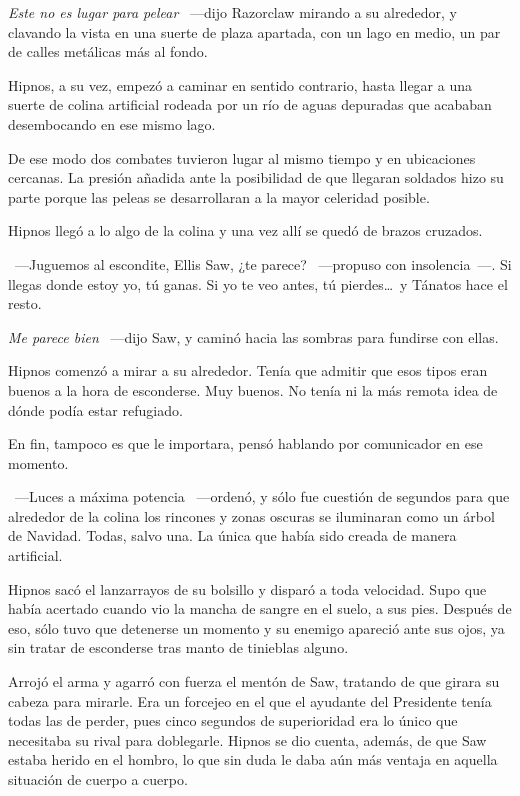 \emph{Este no es lugar para pelear} ~---dijo Razorclaw mirando a su alrededor, y clavando la vista en una suerte de plaza apartada, con un lago en medio, un par de calles metálicas más al fondo.

Hipnos, a su vez, empezó a caminar en sentido contrario, hasta llegar a una suerte de colina artificial rodeada por un río de aguas depuradas que acababan desembocando en ese mismo lago.

De ese modo dos combates tuvieron lugar al mismo tiempo y en ubicaciones cercanas. La presión añadida ante la posibilidad de que llegaran soldados hizo su parte porque las peleas se desarrollaran a la mayor celeridad posible.

Hipnos llegó a lo algo de la colina y una vez allí se quedó de brazos cruzados.

~---Juguemos al escondite, Ellis Saw, ¿te parece? ~---propuso con insolencia~---. Si llegas donde estoy yo, tú ganas. Si yo te veo antes, tú pierdes\dots\ y Tánatos hace el resto.

\emph{Me parece bien} ~---dijo Saw, y caminó hacia las sombras para fundirse con ellas.

Hipnos comenzó a mirar a su alrededor. Tenía que admitir que esos tipos eran buenos a la hora de esconderse. Muy buenos. No tenía ni la más remota idea de dónde podía estar refugiado.

En fin, tampoco es que le importara, pensó hablando por comunicador en ese momento.

~---Luces a máxima potencia ~---ordenó, y sólo fue cuestión de segundos para que alrededor de la colina los rincones y zonas oscuras se iluminaran como un árbol de Navidad. Todas, salvo una. La única que había sido creada de manera artificial.

Hipnos sacó el lanzarrayos de su bolsillo y disparó a toda velocidad. Supo que había acertado cuando vio la mancha de sangre en el suelo, a sus pies. Después de eso, sólo tuvo que detenerse un momento y su enemigo apareció ante sus ojos, ya sin tratar de esconderse tras manto de tinieblas alguno.

Arrojó el arma y agarró con fuerza el mentón de Saw, tratando de que girara su cabeza para mirarle. Era un forcejeo en el que el ayudante del Presidente tenía todas las de perder, pues cinco segundos de superioridad era lo único que necesitaba su rival para doblegarle. Hipnos se dio cuenta, además, de que Saw estaba herido en el hombro, lo que sin duda le daba aún más ventaja en aquella situación de cuerpo a cuerpo.

